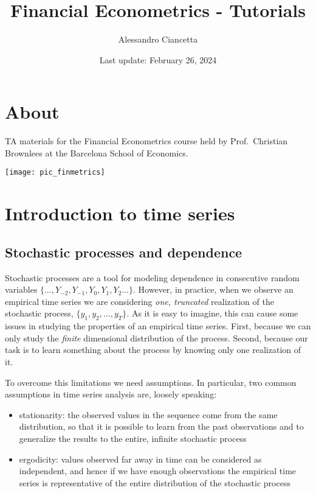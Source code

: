 \documentclass[
]{book}
\title{Financial Econometrics - Tutorials}
\author{Alessandro Ciancetta}
\date{Last update: February 26, 2024}
\begin{document}
\maketitle

{
\setcounter{tocdepth}{1}
\tableofcontents
}
\hypertarget{about}{%
\chapter*{About}\label{about}}

TA materials for the Financial Econometrics course held by Prof.~Christian Brownlees at the Barcelona School of Economics.

\begin{center}\texttt{[image: pic\_finmetrics]} \end{center}

\hypertarget{session01}{%
\chapter{Introduction to time series}\label{session01}}

\hypertarget{stochastic-processes-and-dependence}{%
\section{Stochastic processes and dependence}\label{stochastic-processes-and-dependence}}

Stochastic processes are a tool for modeling dependence in consecutive random variables \(\{\dots, Y_{-2}, Y_{-1}, Y_{0}, Y_{1}, Y_{2} \dots\}\). However, in practice, when we observe an empirical time series we are considering \emph{one, truncated} realization of the stochastic process, \(\{y_1, y_2, \dots, y_T\}\). As it is easy to imagine, this can cause some issues in studying the properties of an empirical time series. First, because we can only study the \emph{finite} dimensional distribution of the process. Second, because our task is to learn something about the process by knowing only one realization of it.

To overcome this limitations we need assumptions. In particular, two common assumptions in time series analysis are, loosely speaking:

\begin{itemize}
\item
  stationarity: the observed values in the sequence come from the same distribution, so that it is possible to learn from the past observations and to generalize the results to the entire, infinite stochastic process
\item
  ergodicity: values observed far away in time can be considered as independent, and hence if we have enough observations the empirical time series is representative of the entire distribution of the stochastic process
\end{itemize}
\end{document}
